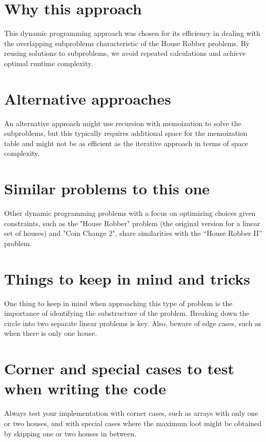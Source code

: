 \section*{Why this approach}
This dynamic programming approach was chosen for its efficiency in dealing with the overlapping subproblems characteristic of the House Robber problems. By reusing solutions to subproblems, we avoid repeated calculations and achieve optimal runtime complexity. 

\section*{Alternative approaches}
An alternative approach might use recursion with memoization to solve the subproblems, but this typically requires additional space for the memoization table and might not be as efficient as the iterative approach in terms of space complexity.

\section*{Similar problems to this one}
Other dynamic programming problems with a focus on optimizing choices given constraints, such as the "House Robber" problem (the original version for a linear set of houses) and "Coin Change 2", share similarities with the “House Robber II” problem.

\section*{Things to keep in mind and tricks}
One thing to keep in mind when approaching this type of problem is the importance of identifying the substructure of the problem. Breaking down the circle into two separate linear problems is key. Also, beware of edge cases, such as when there is only one house. 

\section*{Corner and special cases to test when writing the code}
Always test your implementation with corner cases, such as arrays with only one or two houses, and with special cases where the maximum loot might be obtained by skipping one or two houses in between.